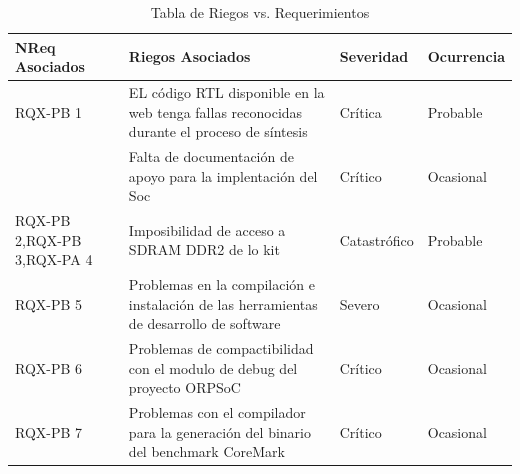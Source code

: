\begin{table}[h!]
		\centering
		\begin{tabular}{ p{2.5cm} p{9cm} p{2cm} p{2cm} }
		\hline 
		\rowcolor[gray]{0.8} N\textordmasculine Req Asociados& Riegos Asociados & Severidad  & Ocurrencia \\
		\hline
		RQX-PB 1& EL código RTL disponible en la web tenga fallas reconocidas durante el proceso de síntesis & Crítica       & Probable \\
		\hline				
				& Falta de documentación de apoyo para la implentación
del Soc & Crítico & Ocasional\\	 
		\hline
		RQX-PB 2,RQX-PB 3,RQX-PA 4 & Imposibilidad de acceso a SDRAM DDR2 de lo kit& Catastrófico & Probable\\
		\hline
		RQX-PB 5&Problemas en la compilación e instalación de las herramientas de desarrollo de software  & Severo  &  Ocasional\\ 
		\hline
		RQX-PB 6& Problemas de compactibilidad con el modulo de debug del proyecto ORPSoC  & Crítico&  Ocasional\\
		\hline
		RQX-PB 7 & Problemas con el compilador para la generación del binario del benchmark CoreMark  & Crítico&  Ocasional\\
		\hline
		\end{tabular}
		\caption{Tabla de Riegos vs. Requerimientos}
		\end{table}

\newpage

